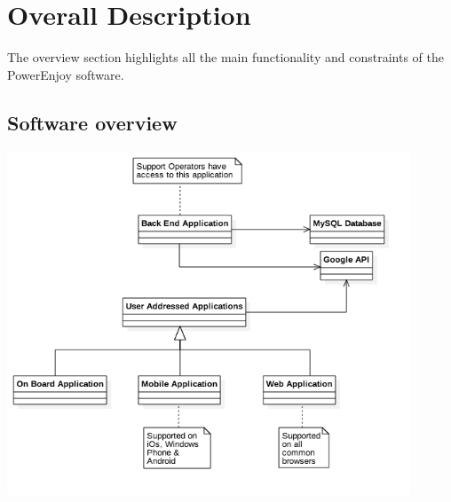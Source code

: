 \documentclass[12pt]{article}
\begin{document}
  \section{\Large Overall Description}
  	The overview section highlights all the main functionality and constraints of the 	
	PowerEnjoy software.  
	
	
	\subsection{Software overview}
	 \begin{center}
 	 	\includegraphics[width=0.9\textwidth ,height=0.9\textwidth ,center]
 	 				    {Images/SoftwareDistribution.png}
	 \end{center}
	
	
	
	 
	 	
\end{document}
